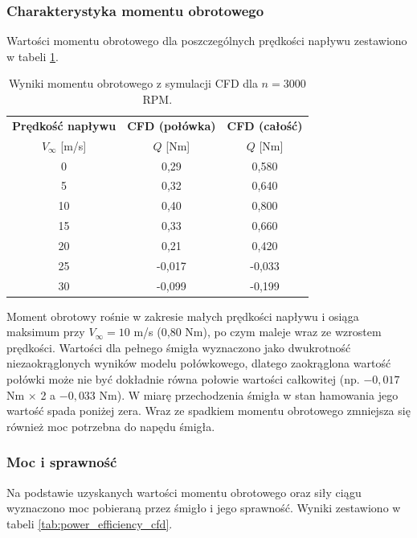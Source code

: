 \documentclass[12pt,a4paper,twoside]{article}
\begin{document}
	\subsubsection{Charakterystyka momentu obrotowego}
	Wartości momentu obrotowego dla poszczególnych prędkości napływu zestawiono w tabeli \ref{tab:torque_results_cfd}.
	
	\begin{table}[H]
		\centering
		\caption{Wyniki momentu obrotowego z symulacji CFD dla \(n = 3000\) RPM.}
		\label{tab:torque_results_cfd}
		\begin{tabular}{@{}c c c@{}}
			\toprule
			\textbf{Prędkość napływu} & \textbf{CFD (połówka)} & \textbf{CFD (całość)} \\
			\(V_\infty\) [m/s] & \(Q\) [Nm] & \(Q\) [Nm] \\
			\midrule
			0  & 0,29    & 0,580    \\
			5  & 0,32    & 0,640    \\
			10 & 0,40    & 0,800    \\
			15 & 0,33    & 0,660    \\
			20 & 0,21    & 0,420    \\
			25 & -0,017  & -0,033   \\
			30 & -0,099  & -0,199   \\
			\bottomrule
		\end{tabular}
	\end{table}
	
	Moment obrotowy rośnie w zakresie małych prędkości napływu i osiąga maksimum przy \(V_\infty = 10\) m/s (0,80 Nm), po czym maleje wraz ze wzrostem prędkości. Wartości dla pełnego śmigła wyznaczono jako dwukrotność niezaokrąglonych wyników modelu połówkowego, dlatego zaokrąglona wartość połówki może nie być dokładnie równa połowie wartości całkowitej (np. \(-0{,}017\) Nm $\times$ 2 a \(-0{,}033\) Nm). W miarę przechodzenia śmigła w stan hamowania jego wartość spada poniżej zera. Wraz ze spadkiem momentu obrotowego zmniejsza się również moc potrzebna do napędu śmigła.
	
	\subsubsection{Moc i sprawność}
	Na podstawie uzyskanych wartości momentu obrotowego oraz siły ciągu wyznaczono moc pobieraną przez śmigło i jego sprawność. Wyniki zestawiono w tabeli \ref{tab:power_efficiency_cfd}.
	
\end{document}
